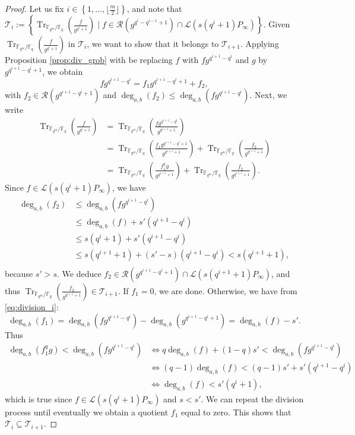 \documentclass[a4paper]{article}
\theoremstyle{definition}
\theoremstyle{remark}
\newcommand{\calL}{\mathcal{L}}
\newcommand{\calR}{\mathcal{R}}
\newcommand{\calT}{\mathcal{T}}
\newcommand{\fq}{\mathbb{F}_{q}}
\newcommand{\Tr}[1]{\operatorname{Tr}_{\mathbb{F}_{q^m}/\fq}\left(#1\right)}
\newcommand{\set}[1]{\left\{#1\right\}}
\newcommand{\degab}[1]{\deg_{a,b}\left(#1\right)}
\begin{document}
\begin{proof}
Let us fix $i \in \set{1,\dots,\lfloor \frac{m}{2} \rfloor}$, and note that 
$\calT_i := \set{\Tr{\frac{f}{g^{q^i+1}}} \mid f \in \calR(g^{q^i-q^{i-1}+1})\cap \calL(s(q^i+1)P_\infty)}.$
Given $\Tr{\frac{f}{g^{q^i+1}}}$ in $\calT_i$, we want to show that it belongs to $\calT_{i+1}$. Applying Proposition \ref{prop:div_grob} with be replacing $f$ with $fg^{q^{i+1}-q^i}$ and $g$ by $g^{q^{i+1}-q^i+1}$, we obtain
\begin{equation} \label{eq:division_i}
fg^{q^{i+1}-q^i} = f_1g^{q^{i+1}-q^i+1} + f_2,
\end{equation}
with $f_2 \in \calR(g^{q^{i+1}-q^i+1})$ and $\degab{f_2} \leq \degab{fg^{q^{i+1}-q^i}}$. Next, we write
\begin{align*}
    \Tr{\frac{f}{g^{q^i+1}}} &= \Tr{\frac{fg^{q^{i+1}-q^i}}{g^{q^{i+1}+1}}} \\
                             &= \Tr{\frac{f_1g^{q^{i+1}-q^i+1}}{g^{q^{i+1}+1}}} + \Tr{\frac{f_2}{g^{q^{i+1}+1}}} \\
                             &= \Tr{\frac{f_1^qg}{g^{q^{i+1}+1}}} + \Tr{\frac{f_2}{g^{q^{i+1}+1}}}.
\end{align*}
Since $f \in \calL(s(q^i+1)P_\infty)$, we have
\begin{align*}
\degab{f_2} &\leq \degab{fg^{q^{i+1}-q^i}} \\
            & \leq \degab{f} + s'(q^{i+1}-q^i) \\
            & \leq s(q^i+1) + s'(q^{i+1}-q^i) \\
            & \leq s(q^{i+1}+1) + (s'-s)(q^{i+1}-q^i) < s(q^{i+1}+1),\\
\end{align*}
because $s' >s$. We deduce $f_2 \in \calR(g^{q^{i+1}-q^{i}+1})\cap \calL(s(q^{i+1}+1)P_\infty)$, and thus  $\Tr{\frac{f_2}{g^{q^{i+1}+1}}} \in \calT_{i+1}.$
If $f_1=0$, we are done. Otherwise, we have from \eqref{eq:division_i}:
$$\degab{f_1} = \degab{fg^{q^{i+1}-q^i}} - \degab{g^{q^{i+1}-q^i+1}} = \degab{f}-s'.$$
Thus
\begin{align*}
     \degab{f_1^qg} < \degab{fg^{q^{i+1}-q^i}} & \iff q\degab{f} +(1-q)s' < \degab{fg^{q^{i+1}-q^i}} \\
                                               & \iff (q-1)\degab{f} < (q-1)s' + s'(q^{i+1}-q^i) \\
                                               & \iff \degab{f} < s'(q^{i}+1),
\end{align*}
which is true since $f \in \calL(s(q^i+1)P_\infty)$ and $s<s'$. We can repeat the division process until eventually we obtain a quotient $f_1$ equal to zero. This shows that $\calT_i \subseteq \calT_{i+1}$.


\end{proof}
\end{document}

